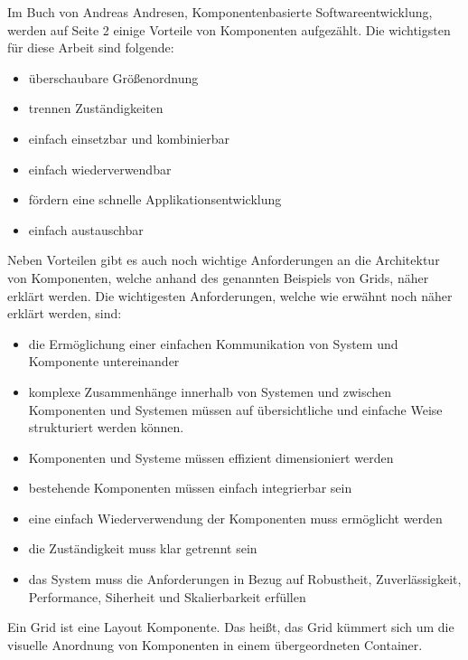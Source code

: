 Im Buch von Andreas Andresen, Komponentenbasierte Softwareentwicklung, \autocite[]{Andresen.2003} werden auf Seite 2 einige Vorteile von Komponenten aufgezählt. Die wichtigsten für diese Arbeit sind folgende:
\begin{itemize}
  \item überschaubare Größenordnung
  \item trennen Zuständigkeiten
  \item einfach einsetzbar und kombinierbar
  \item einfach wiederverwendbar
  \item fördern eine schnelle Applikationsentwicklung
  \item einfach austauschbar
\end{itemize} 
Neben Vorteilen gibt es auch noch wichtige Anforderungen an die Architektur von Komponenten, welche anhand des genannten Beispiels von Grids, näher erklärt werden. Die wichtigesten Anforderungen, welche wie erwähnt noch näher erklärt werden, sind: 
\begin{itemize}
  \item die Ermöglichung  einer einfachen Kommunikation von System und Komponente untereinander
  \item komplexe Zusammenhänge innerhalb von Systemen und zwischen Komponenten und Systemen müssen auf übersichtliche und einfache Weise strukturiert werden können.
  \item Komponenten und Systeme müssen effizient dimensioniert werden
  \item bestehende Komponenten müssen einfach integrierbar sein
  \item eine einfach Wiederverwendung der Komponenten muss ermöglicht werden
  \item die Zuständigkeit muss klar getrennt sein
  \item das System muss die Anforderungen in Bezug auf Robustheit, Zuverlässigkeit, Performance, Siherheit und Skalierbarkeit erfüllen
\end{itemize} \autocite[6]{Andresen.2003}

Ein Grid ist eine Layout Komponente. Das heißt, das Grid kümmert sich um die visuelle Anordnung von Komponenten in einem übergeordneten Container. 
\newpage
